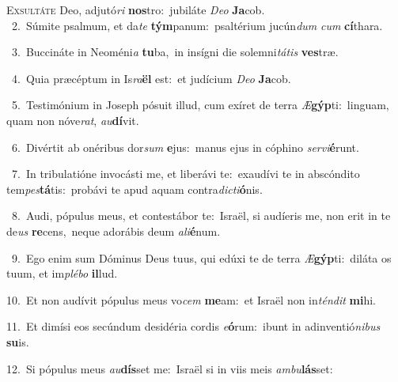 \lettrine{\initial\textcolor{\initialcolor}{E}}{xsultáte} Deo, adjutó\textit{ri} \textbf{nos}\-tro:~\star jubiláte \textit{De}\-\textit{o} \textbf{Ja}\-cob.\\
{\numbfont\textcolor{\numbcolor}{~2.}}~Súmite psalmum, et da\textit{te} \textbf{tým}\-panum:~\star psaltérium jucún\textit{dum} \textit{cum} \textbf{cí}\-thara.\par
{\numbfont\textcolor{\numbcolor}{~3.}}~Buccináte in Neoméni\textit{a} \textbf{tu}\-ba,~\star in insígni die solemni\-\textit{tá}\-\textit{tis} \textbf{ves}\-træ.\par
{\numbfont\textcolor{\numbcolor}{~4.}}~Quia præcéptum in Is\-\textit{ra}\-\textbf{ël} est:~\star et judícium \textit{De}\-\textit{o} \textbf{Ja}\-cob.\par
{\numbfont\textcolor{\numbcolor}{~5.}}~Testimónium in Joseph pósuit illud, cum exíret de terra \textit{Æ}\-\textbf{gýp}ti:~\star linguam, quam non nóve\-\textit{rat}\-, \textit{au}\-\textbf{dí}vit.\par
{\numbfont\textcolor{\numbcolor}{~6.}}~Divértit ab onéribus dor\textit{sum} \textbf{e}\-jus:~\star manus ejus in cóphino \textit{ser}\-\textit{vi}\textbf{é}runt.\par
{\numbfont\textcolor{\numbcolor}{~7.}}~In tribulatióne invocásti me, et liberávi te:~\dagger exaudívi te in abscóndito tem\-\textit{pes}\-\textbf{tá}tis:~\star probávi te apud aquam contra\-\textit{dic}\-\textit{ti}\textbf{ó}nis.\par
{\numbfont\textcolor{\numbcolor}{~8.}}~Audi, pópulus meus, et contestábor te:~\dagger Israël, si audíeris me, non erit in te de\textit{us} \textbf{re}\-cens,~\star neque adorábis deum \textit{a}\-\textit{li}\textbf{é}num.\par
{\numbfont\textcolor{\numbcolor}{~9.}}~Ego enim sum Dóminus Deus tuus, qui edúxi te de terra \textit{Æ}\-\textbf{gýp}ti:~\star diláta os tuum, et im\-\textit{plé}\-\textit{bo} \textbf{il}\-lud.\par
{\numbfont\textcolor{\numbcolor}{10.}}~Et non audívit pópulus meus vo\textit{cem} \textbf{me}\-am:~\star et Israël non in\-\textit{tén}\-\textit{dit} \textbf{mi}\-hi.\par
{\numbfont\textcolor{\numbcolor}{11.}}~Et dimísi eos secúndum desidéria cordis \textit{e}\-\textbf{ó}rum:~\star ibunt in adinventió\-\textit{ni}\-\textit{bus} \textbf{su}\-is.\par
{\numbfont\textcolor{\numbcolor}{12.}}~Si pópulus meus \textit{au}\-\textbf{dís}set me:~\star Israël si in viis meis \textit{am}\-\textit{bu}\textbf{lás}set:\par
